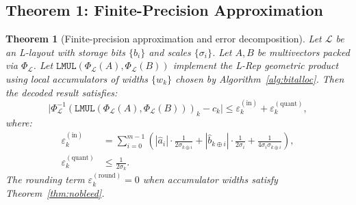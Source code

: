 \documentclass[11pt,a4paper]{article}
\theoremstyle{definition}
\theoremstyle{plain}
\newtheorem{theorem}{Theorem}[section]
\theoremstyle{remark}
\newcommand{\Pack}{\Phi_{\mathcal{L}}}
\newcommand{\Unpack}{\Phi^{-1}_{\mathcal{L}}}
\begin{document}
\subsection{Theorem 1: Finite-Precision Approximation}
\label{sec:approx}

\begin{theorem}[Finite-precision approximation and error decomposition]
\label{thm:finite-approx}
Let $\mathcal{L}$ be an L-layout with storage bits $\{b_i\}$ and scales
$\{\sigma_i\}$.
Let $A,B$ be multivectors packed via $\Pack$.
Let $\mathtt{LMUL}(\Pack(A),\Pack(B))$ implement the L-Rep geometric
product using local accumulators of widths $\{w_k\}$ chosen by
Algorithm~\ref{alg:bitalloc}.
Then the decoded result satisfies:
\begin{equation}\label{eq:error-main}
  \bigl|\Unpack(\mathtt{LMUL}(\Pack(A),\Pack(B)))_k - c_k\bigr|
  \le \varepsilon_k^{(\mathrm{in})} + \varepsilon_k^{(\mathrm{quant})},
\end{equation}
where:
\begin{align}
  \varepsilon_k^{(\mathrm{in})}
  &= \sum_{i=0}^{m-1}\!\left(
    |\hat{a}_i|\cdot\frac{1}{2\sigma_{k\oplus i}}
    +|\hat{b}_{k\oplus i}|\cdot\frac{1}{2\sigma_i}
    +\frac{1}{4\sigma_i\sigma_{k\oplus i}}\right),
    \label{eq:eps-in}\\
  \varepsilon_k^{(\mathrm{quant})} &\le \frac{1}{2\sigma_k}.
    \label{eq:eps-quant}
\end{align}
The rounding term $\varepsilon_k^{(\mathrm{round})}=0$ when accumulator
widths satisfy Theorem~\ref{thm:nobleed}.
\end{theorem}
\end{document}
